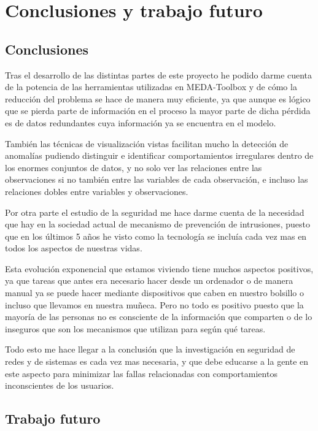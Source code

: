 \chapter{Conclusiones y trabajo futuro}
\section{Conclusiones}

Tras el desarrollo de las distintas partes de este proyecto he podido darme cuenta de la potencia de las herramientas utilizadas en MEDA-Toolbox y de cómo la reducción del problema se hace de manera muy eficiente, ya que aunque es lógico que se pierda parte de información en el proceso la mayor parte de dicha pérdida es de datos redundantes cuya información ya se encuentra en el modelo.
\bigskip

También las técnicas de visualización vistas facilitan mucho la detección de anomalías pudiendo distinguir e identificar comportamientos irregulares dentro de los enormes conjuntos de datos, y no solo ver las relaciones entre las observaciones si no también entre las variables de cada observación, e incluso las relaciones dobles entre variables y observaciones.
\bigskip

Por otra parte el estudio de la seguridad me hace darme cuenta de la necesidad que hay en la sociedad actual de mecanismo de prevención de intrusiones, puesto que en los últimos 5 años he visto como la tecnología se incluía cada vez mas en todos los aspectos de nuestras vidas. 
\bigskip

Esta evolución exponencial que estamos viviendo tiene muchos aspectos positivos, ya que tareas que antes era necesario hacer desde un ordenador o de manera manual ya se puede hacer mediante dispositivos que caben en nuestro bolsillo o incluso que llevamos en nuestra muñeca. Pero no todo es positivo puesto que la mayoría de las personas no es consciente de la información que comparten o de lo inseguros que son los mecanismos que utilizan para según qué tareas. 
\bigskip

Todo esto me hace llegar a la conclusión que la investigación en seguridad de redes y de sistemas es cada vez mas necesaria, y que debe educarse a la gente en este aspecto para minimizar las fallas relacionadas con comportamientos inconscientes de los usuarios. 


\section{Trabajo futuro}

